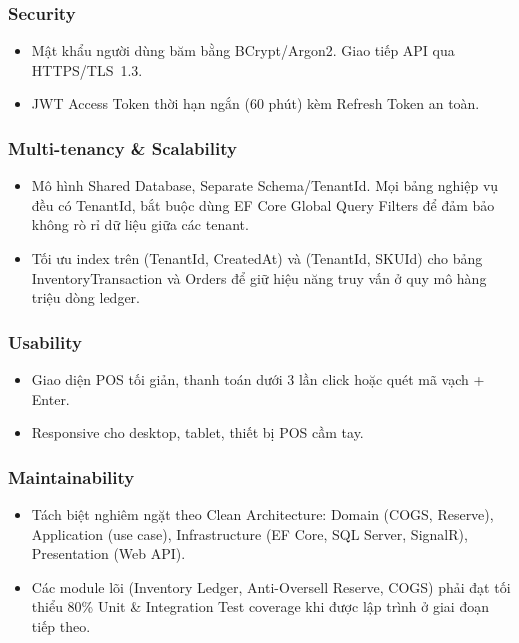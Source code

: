\subsubsection{Security}
\begin{itemize}
    \item Mật khẩu người dùng băm bằng BCrypt/Argon2. Giao tiếp API qua HTTPS/TLS~1.3.
    \item JWT Access Token thời hạn ngắn (60 phút) kèm Refresh Token an toàn.
\end{itemize}

\subsubsection{Multi-tenancy \& Scalability}
\begin{itemize}
    \item Mô hình Shared Database, Separate Schema/TenantId. Mọi bảng nghiệp vụ đều có TenantId, bắt buộc dùng EF Core Global Query Filters để đảm bảo không rò rỉ dữ liệu giữa các tenant.
    \item Tối ưu index trên (TenantId, CreatedAt) và (TenantId, SKUId) cho bảng InventoryTransaction và Orders để giữ hiệu năng truy vấn ở quy mô hàng triệu dòng ledger.
\end{itemize}

\subsubsection{Usability}
\begin{itemize}
    \item Giao diện POS tối giản, thanh toán dưới 3 lần click hoặc quét mã vạch + Enter.
    \item Responsive cho desktop, tablet, thiết bị POS cầm tay.
\end{itemize}

\subsubsection{Maintainability}
\begin{itemize}
    \item Tách biệt nghiêm ngặt theo Clean Architecture: Domain (COGS, Reserve), Application (use case), Infrastructure (EF Core, SQL Server, SignalR), Presentation (Web API).
    \item Các module lõi (Inventory Ledger, Anti-Oversell Reserve, COGS) phải đạt tối thiểu 80\% Unit \& Integration Test coverage khi được lập trình ở giai đoạn tiếp theo.
\end{itemize}

